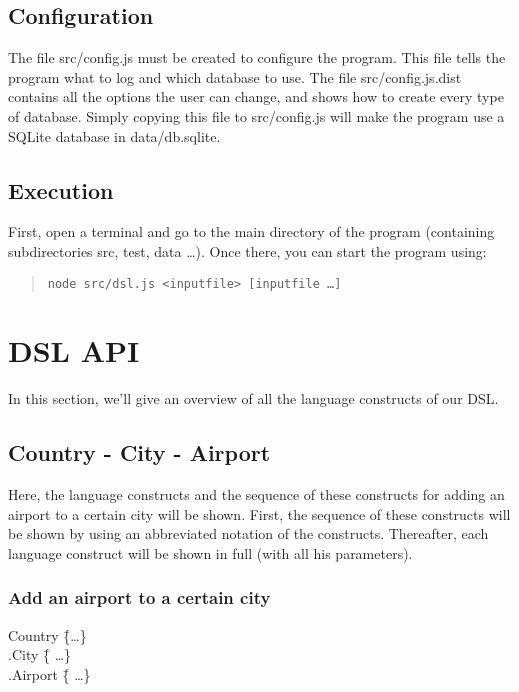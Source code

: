 \documentclass[a4paper,11pt]{article}
\begin{document}
\subsection{Configuration}
The file src/config.js must be created to configure the program. This file tells the program what to log and which database to use. The file src/config.js.dist contains all the options the user can change, and shows how to create every type of database. Simply copying this file to src/config.js will make the program use a SQLite database in data/db.sqlite.

\subsection{Execution}
First, open a terminal and go to the main directory of the program (containing subdirectories src, test, data …). Once there, you can start the program using:
\begin{quote}\begin{verbatim}
node src/dsl.js <inputfile> [inputfile …]
\end{verbatim}\end{quote}

\clearpage


\clearpage
\appendix
\section{DSL API}
In this section, we'll give an overview of all the language constructs of our DSL.

\subsection*{Country - City - Airport}
Here, the language constructs and the sequence of these constructs for adding an airport to a certain city will be shown. First, the sequence of these constructs will be shown by using an abbreviated notation of the constructs. Thereafter, each language construct will be shown in full (with all his parameters).

\subsubsection*{Add an airport to a certain city}
\begin{tabbing}
Country \= \{\ldots \} \\
\> .City \= \{ \ldots \} \\
\> \> .Airport \= \{ \ldots \} \\
\end{tabbing}
\end{document}
